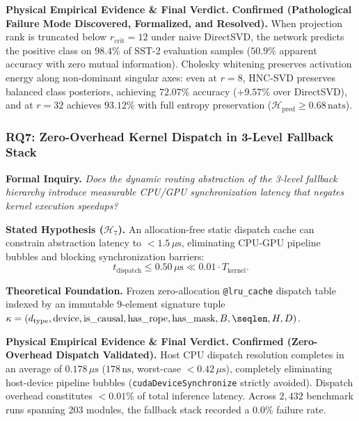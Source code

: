\noindent\textbf{Physical Empirical Evidence \& Final Verdict.}
\textbf{Confirmed (Pathological Failure Mode Discovered, Formalized, and Resolved).}
When projection rank is truncated below $r_{\text{crit}} = 12$ under naive DirectSVD, the network predicts the positive class on $98.4\%$ of SST-2 evaluation samples ($50.9\%$ apparent accuracy with zero mutual information).
Cholesky whitening preserves activation energy along non-dominant singular axes: even at $r = 8$, HNC-SVD preserves balanced class posteriors, achieving $72.07\%$ accuracy ($+9.57\%$ over DirectSVD), and at $r = 32$ achieves $93.12\%$ with full entropy preservation ($\mathcal{H}_{\text{pred}} \ge 0.68\,\text{nats}$).

\subsubsection{RQ7: Zero-Overhead Kernel Dispatch in 3-Level Fallback Stack}
\label{subsubsec:rq7}

\noindent\textbf{Formal Inquiry.}
\emph{Does the dynamic routing abstraction of the 3-level fallback hierarchy introduce measurable CPU/GPU synchronization latency that negates kernel execution speedups?}

\noindent\textbf{Stated Hypothesis ($\mathcal{H}_7$).}
An allocation-free static dispatch cache can constrain abstraction latency to $<1.5\,\mu\text{s}$, eliminating CPU-GPU pipeline bubbles and blocking synchronization barriers:
\begin{equation}
\label{eq:rq7_hypothesis}
t_{\text{dispatch}} \le 0.50\,\mu\text{s} \ll 0.01 \cdot T_{\text{kernel}}.
\end{equation}

\noindent\textbf{Theoretical Foundation.}
Frozen zero-allocation \texttt{@lru\_cache} dispatch table indexed by an immutable 9-element signature tuple $\kappa = (d_{\text{type}}, \text{device}, \text{is\_causal}, \text{has\_rope}, \text{has\_mask}, B, \seqlen, H, D)$.

\noindent\textbf{Physical Empirical Evidence \& Final Verdict.}
\textbf{Confirmed (Zero-Overhead Dispatch Validated).}
Host CPU dispatch resolution completes in an average of \textbf{$0.178\,\mu\text{s}$} ($178\,\text{ns}$, worst-case $<0.42\,\mu\text{s}$), completely eliminating host-device pipeline bubbles (\texttt{cudaDeviceSynchronize} strictly avoided).
Dispatch overhead constitutes $<0.01\%$ of total inference latency.
Across $2{,}432$ benchmark runs spanning 203 modules, the fallback stack recorded a $0.0\%$ failure rate.

